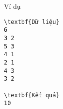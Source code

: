 Ví dụ  
\begin{verbatim}
\textbf{Dữ liệu}
6 
3 2 
5 3 
4 1 
2 1 
4 3 
3 2

\textbf{Kết quả}
10
\end{verbatim}